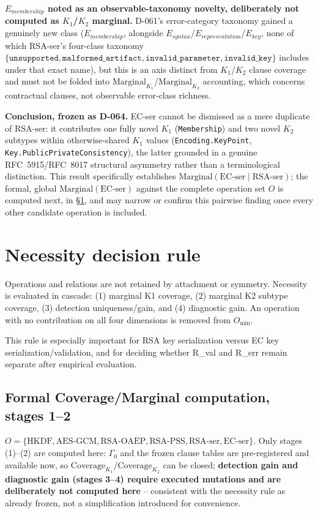 \documentclass[11pt,a4paper]{article}
\begin{document}
\textbf{$E_{membership}$ noted as an observable-taxonomy novelty, deliberately not computed as $K_1$/$K_2$ marginal.} D-061's error-category taxonomy gained a genuinely new class ($E_{membership}$, alongside $E_{syntax}$/$E_{representation}$/$E_{key}$, none of which RSA-ser's four-class taxonomy $\{\texttt{unsupported}, \texttt{malformed\_artifact}, \texttt{invalid\_parameter}, \texttt{invalid\_key}\}$ includes under that exact name), but this is an axis distinct from $K_1$/$K_2$ clause coverage and must not be folded into $\text{Marginal}_{K_1}$/$\text{Marginal}_{K_2}$ accounting, which concerns contractual clauses, not observable error-class richness.

\textbf{Conclusion, frozen as D-064.} EC-ser cannot be dismissed as a mere duplicate of RSA-ser: it contributes one fully novel $K_1$ (\texttt{Membership}) and two novel $K_2$ subtypes within otherwise-shared $K_1$ values (\texttt{Encoding.KeyPoint}, \texttt{Key.PublicPrivateConsistency}), the latter grounded in a genuine RFC~5915/RFC~8017 structural asymmetry rather than a terminological distinction. This result specifically establishes $\text{Marginal}(\text{EC-ser}\mid\text{RSA-ser})$; the formal, global $\text{Marginal}(\text{EC-ser})$ against the complete operation set $O$ is computed next, in \S\ref{sec:necessity}, and may narrow or confirm this pairwise finding once every other candidate operation is included.

\section{Necessity decision rule}\label{sec:necessity}


Operations and relations are not retained by attachment or symmetry. Necessity is evaluated in cascade: (1) marginal K1 coverage, (2) marginal K2 subtype coverage, (3) detection uniqueness/gain, and (4) diagnostic gain. An operation with no contribution on all four dimensions is removed from $O_{\min}$.

This rule is especially important for RSA key serialization versus EC key serialization/validation, and for deciding whether R\_val and R\_err remain separate after empirical evaluation.

\subsection{Formal Coverage/Marginal computation, stages 1--2}\label{sec:coverage-marginal}

$O = \{\text{HKDF}, \text{AES-GCM}, \text{RSA-OAEP}, \text{RSA-PSS}, \text{RSA-ser}, \text{EC-ser}\}$. Only stages (1)--(2) are computed here: $\Gamma_0$ and the frozen clause tables are pre-registered and available now, so $\text{Coverage}_{K_1}/\text{Coverage}_{K_2}$ can be closed; \textbf{detection gain and diagnostic gain (stages 3--4) require executed mutations and are deliberately not computed here} -- consistent with the necessity rule as already frozen, not a simplification introduced for convenience.
\end{document}
